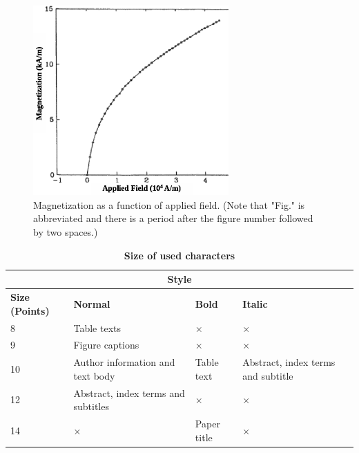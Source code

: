 \documentclass[10pt,twoside,a4paper]{article}
\begin{document}
\begin{figure}[H]
\includegraphics[angle=0,width=75mm]{figuraeng.eps}
\centering
\captiondelim{}
\captionstyle{\small\centering}
\caption{  Magnetization as a function of applied field. (Note that "Fig." is abbreviated and there is a period after the figure number followed by two spaces.)}
\par
\vspace{-.5cm}
\label{fig:fig1}
\end{figure}


\begin{table}[H]
\renewcommand{\arraystretch}{1.1}
\centering
\captiondelim{}
\captionstyle{\\}
\caption{ \textbf{Size of used characters}}
\scriptsize
\setlength{\tabcolsep}{8pt}
\begin{center}
\begin{tabular}{p{0.5cm}p{2cm}p{1.5cm}p{2cm}}
\hline
\cline{1-4} 
\multicolumn{4}{c}{\textbf{Style}} \\
\hline
\textbf{Size (Points)} & \textbf{Normal} & \textbf{Bold} & \textbf{Italic} \\ 
\hline
8 & Table texts & × & × \\ 
\hline
9 & Figure captions & × & × \\ 
\hline
10 & Author information and text body & Table text & Abstract, index terms and subtitle \\ 
\hline
12 & Abstract, index terms and subtitles & × & × \\ 
\hline
14 & × & Paper title & ×\\
\hline
\cline{1-4} 
\end{tabular}\label{table:TableI}
\end{center}
\end{table}

\end{document}
